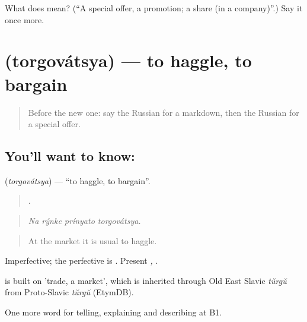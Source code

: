 \begin{tcolorbox}[breakable,colback=teal!4,colframe=teal!35!black,title={Before you move on}]
What does  mean? (\textquotedblleft{}A special offer, a promotion; a share (in a company)\textquotedblright{}.) Say it once more.
\end{tcolorbox}
\section[\texorpdfstring{\ru{торговаться} (torgovátsya)}{торговаться (torgovátsya)}]{ (torgovátsya) — to haggle, to bargain}

\label{lesson:RU-C454-torgovatsya}



\begin{quote}
Before the new one: say the Russian for a markdown, then the Russian for a special offer.
\end{quote}

\subsection*{You'll want to know: }
\textbf{} (\emph{torgovátsya}) — \textquotedblleft{}to haggle, to bargain\textquotedblright{}.

\begin{quote}
   .
\end{quote}

\begin{quote}
\emph{Na rýnke prínyato torgovátsya.}
\end{quote}

\begin{quote}
At the market it is usual to haggle.
\end{quote}

Imperfective; the perfective is \emph{}. Present \emph{, }.

\begin{cousinweb}
\emph{} is built on \emph{} 'trade, a market', which is inherited through Old East Slavic \emph{tŭrgŭ} from Proto-Slavic \emph{tŭrgŭ} (EtymDB).
\end{cousinweb}

\begin{grammarlens}[title={What you've built}]
One more word for telling, explaining and describing at B1.
\end{grammarlens}

